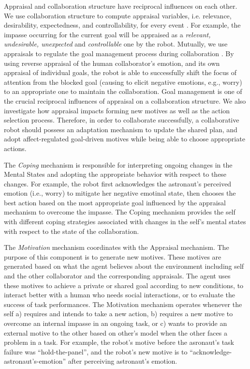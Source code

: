 \documentclass[letterpaper]{article}
\begin{document}
Appraisal and collaboration structure have reciprocal influences on each
other. We use collaboration structure to compute appraisal variables, i.e.
relevance, desirability, expectedness, and controllability, for every event
\cite{shayganfar:appraisal}. For example, the impasse occurring for the
current goal will be appraised as a \textit{relevant, undesirable, unexpected}
and \textit{controllable} one by the robot. Mutually, we use appraisals to
regulate the goal management process during collaboration
\cite{shayganfar:goal-management}. By using reverse appraisal
\cite{gratch:reverse-appraisal} of the human collaborator's emotion, and its own
appraisal of individual goals, the robot is able to successfully shift the focus
of attention from the blocked goal (causing to elicit negative emotions, e.g.,
worry) to an appropriate one to maintain the collaboration. Goal management is
one of the crucial reciprocal influences of appraisal on a collaboration
structure. We also investigate how appraisal impacts forming new motives as well
as the action selection process. Therefore, in order to collaborate
successfully, a collaborative robot should possess an adaptation mechanism to
update the shared plan, and adopt affect-regulated goal-driven motives while
being able to choose appropriate actions.

The \textit{Coping} mechanism is responsible for interpreting ongoing changes
in the Mental States and adopting the appropriate behavior with respect to these
changes. For example, the robot first acknowledges the astronaut's perceived
emotion (i.e., worry) to mitigate her negative emotinal state, then chooses the
best action based on the most appropriate goal influenced by the appraisal
mechanism to overcome the impasse. The Coping mechanism provides the self with
different coping strategies associated with changes in the self's mental states
with respect to the state of the collaboration.

The \textit{Motivation} mechanism coordinates with the Appraisal mechanism. The
purpose of this component is to generate new motives. These motives are
generated based on what the agent believes about the environment including self
and the other collaborator and the corresponding appraisals. The agent uses
these motives to achieve a private or shared goal according to new conditions,
to interact better with a human who needs social interactions, or to evaluate
the success of task performances. The Motivation mechanism operates whenever the
self a) requires and intends to take a new action, b) requires a new motive to
overcome an internal impasse in an ongoing task, or c) wants to provide an
external motive to the other based on other's model when the other faces a
problem in a task. For example, the robot's motive before the asronaut's task
failure was ``hold-the-panel'', and the robot's new motive is to
``acknowledge-astronaut's-emotion'' after perceiving astronaut's emotion.
\end{document}
